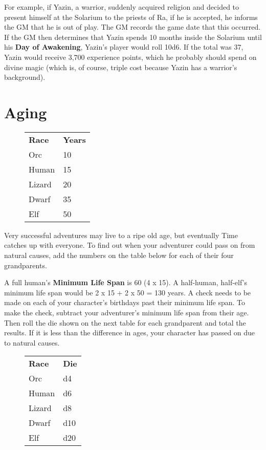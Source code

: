 \begin{multicols*}{2}
For example, if Yazin, a warrior, suddenly acquired religion and decided to present himself at the Solarium to the priests of Ra, if he is accepted, he informs the GM that he is out of play. The GM records the game date that this occurred. If the GM then determines that Yazin spends 10 months inside the Solarium until his \textbf{Day of Awakening}, Yazin's player would roll 10d6. If the total was 37, Yazin would receive 3,700 experience points, which he probably should spend on divine magic (which is, of course, triple cost because Yazin has a warrior's background).
\section{Aging}
\begin{wrapfigure}[9]{o}[0pt]{3cm}
\begin{normbox}
\begin{tabular}{@{}l l}
\textbf{Race} & \textbf{Years}\\
Orc & 10\\
Human & 15\\
Lizard & 20\\
Dwarf & 35\\
Elf & 50\\
\end{tabular}
\end{normbox}
\end{wrapfigure}
Very successful adventures may live to a ripe old age, but eventually Time catches up with everyone. To find out when your adventurer could pass on from natural causes,
add the numbers on the table below for each of their four grandparents.

A full human's \textbf{Minimum Life Span} is 60 (4 x 15). A half-human, half-elf's minimum life span would be 2 x 15 + 2 x 50 = 130 years. A check needs to be made on each of your character's birthdays past their minimum life span. To make the check, subtract your adventurer's minimum life span from their age. Then roll the die shown on the next table for each grandparent and total the results. If it is less than the difference in ages, your character has passed on due to natural causes.
\begin{wrapfigure}[9]{o}[0pt]{3cm}
\begin{normbox}
\begin{tabular}{@{}l l}
\textbf{Race} & \textbf{Die}\\
Orc & d4\\
Human & d6\\
Lizard & d8\\
Dwarf & d10\\
Elf & d20\\
\end{tabular}
\end{normbox}
\end{wrapfigure}


\end{multicols*}

